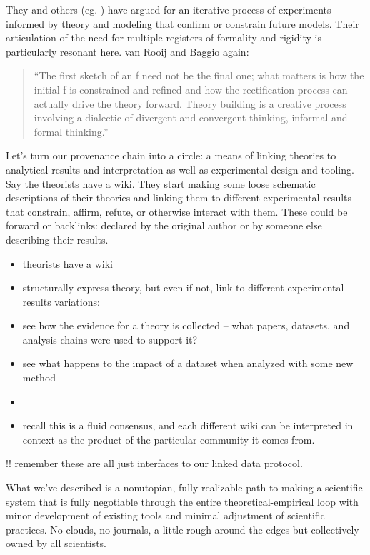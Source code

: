 \documentclass[10pt]{tufte-book}
\begin{document}
They and others (eg. \citep{guestHowComputationalModeling2021} )
have argued for an iterative process of experiments informed by theory
and modeling that confirm or constrain future models. Their articulation
of the need for multiple registers of formality and rigidity is
particularly resonant here. van Rooij and Baggio again:

\begin{quote}
``The first sketch of an f need not be the final one; what matters is
how the initial f is constrained and refined and how the rectification
process can actually drive the theory forward. Theory building is a
creative process involving a dialectic of divergent and convergent
thinking, informal and formal thinking.'' \citep{vanrooijTheoryTestHow2021} 
\end{quote}

Let's turn our provenance chain into a circle: a means of linking
theories to analytical results and interpretation as well as
experimental design and tooling. Say the theorists have a wiki. They
start making some loose schematic descriptions of their theories and
linking them to different experimental results that constrain, affirm,
refute, or otherwise interact with them. These could be forward or
backlinks: declared by the original author or by someone else describing
their results.


\begin{itemize}

\item
  theorists have a wiki
\item
  structurally express theory, but even if not, link to different
  experimental results variations:
\item
  see how the evidence for a theory is collected -- what papers,
  datasets, and analysis chains were used to support it?
\item
  see what happens to the impact of a dataset when analyzed with some
  new method
\item
\item
  recall this is a fluid consensus, and each different wiki can be
  interpreted in context as the product of the particular community it
  comes from.
\end{itemize}

!! remember these are all just interfaces to our linked data protocol.

What we've described is a nonutopian, fully realizable path to making a
scientific system that is fully negotiable through the entire
theoretical-empirical loop with minor development of existing tools and
minimal adjustment of scientific practices. No clouds, no journals, a
little rough around the edges but collectively owned by all scientists.
\end{document}
